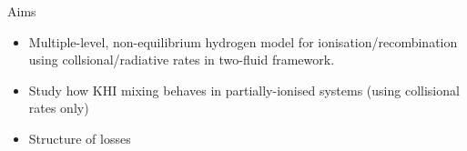 \documentclass[10pt,aspectratio=169,usenames,dvipsnames]{beamer}
\begin{document}

\begin{frame}{Aims}
\begin{itemize}
    \item Multiple-level, non-equilibrium hydrogen model for ionisation/recombination using collsional/radiative rates in two-fluid framework.
    \item Study how KHI mixing behaves in partially-ionised systems (using collisional rates only)
    \item Structure of losses
\end{itemize}
\end{frame}

\end{document}
